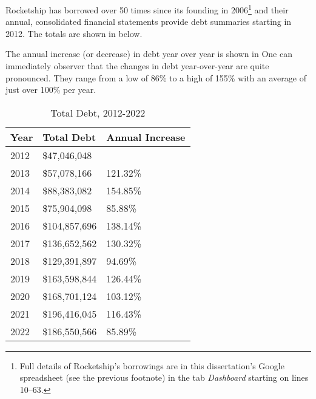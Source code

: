 Rocketship has borrowed over 50 times since its founding in 2006\footnote{Full details of Rocketship's borrowings are in this dissertation's Google spreadsheet (see the previous footnote) in the tab \textit{Dashboard} starting on lines 10–63.} 
and their annual, consolidated financial statements provide debt summaries starting in 2012. The totals are shown in  below.

The annual increase (or decrease) in debt year over year is shown in  One can immediately observer that the changes in debt year-over-year are quite pronounced. They range from a low of 86\% to a high of 155\% with an average of just over 100\% per year.
  
\begin{table}[ht]\caption{Total Debt, 2012-2022}\label{tab:total_debt}
  \begin{tabular}{lll}
    \toprule
    \textbf{Year} & \textbf{Total Debt} & \textbf{Annual Increase}\\
    \midrule
    2012 &  \$47,046,048 & \\
    2013 &  \$57,078,166 & 121.32\% \\
    2014 &  \$88,383,082 & 154.85\% \\
    2015 &  \$75,904,098 &  85.88\% \\
    2016 & \$104,857,696 & 138.14\% \\
    2017 & \$136,652,562 & 130.32\% \\
    2018 & \$129,391,897 &  94.69\% \\
    2019 & \$163,598,844 & 126.44\% \\
    2020 & \$168,701,124 & 103.12\% \\ 
    2021 & \$196,416,045 & 116.43\% \\
    2022 & \$186,550,566 &  85.89\% \\
    \bottomrule
  \end{tabular}
\end{table}



